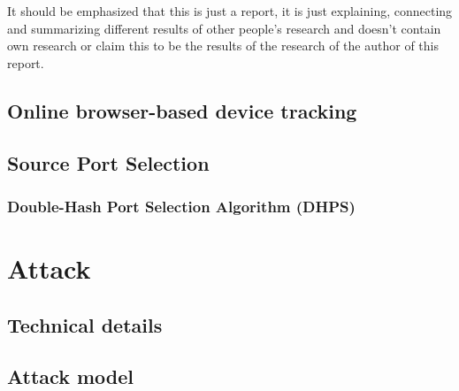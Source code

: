 \documentclass{report}
\begin{document}
\alert{It should be emphasized that this is just a report, it is just explaining, connecting and summarizing different results of other people's research and doesn't contain own research or claim this to be the results of the research of the author of this report}. 



\section{Online browser-based device tracking}
\label{sec:Online browser-based device tracking}

\section{Source Port Selection}
\label{sec:source port selection}

\subsection{Double-Hash Port Selection Algorithm (DHPS)}
\label{sec:double-hash port selection algorithm}

\begin{center}
		\begin{minipage}[t]{0.5\textwidth}
			\vspace{0cm}

			
		\end{minipage}
\end{center}


\vspace{0.5cm}
\chapter{Attack}
\label{sec:attack}

\section{Technical details}
\label{sec:technical details}

\section{Attack model} %
\label{sec:attack model}
\end{document}
